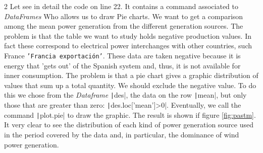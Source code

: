 \begin{paracol}{2}
Let see in detail the code on line 22. It contains a command associated to \emph{DataFrames} Who allows us to draw Pie charts. We want to get a comparison among the mean power generation from the different generation sources. The problem is that the table we want to study holds negative production values. In fact these correspond to electrical power interchanges with other countries, such France \texttt{'Francia exportación'}. These data are taken negative because it is energy that 'gets out' of the Spanish system and, thus, it is not available for inner consumption. The problem is that a pie chart gives a graphic distribution of values that sum up a total quantity. We should exclude the negative value. To do this we chose from the  \emph{Dataframe} \texttt|des|, the data on the row \texttt|mean|, but only those that are greater than zero: \texttt|des.loc['mean']>0|. Eventually, we call the command \texttt|plot.pie| to draw the graphic. The result is shown if figure \ref{fig:pastm}. It very clear to see the distribution of each kind of power generation source used in the period covered by the data and, in particular, the dominance of wind power generation.       
\end{paracol}
	 	
